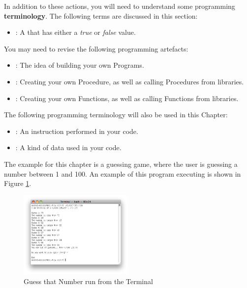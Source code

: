 In addition to these actions, you will need to understand some programming \textbf{terminology}. The following terms are discussed in this section:
\begin{itemize}
  \item {}: A  that has either a \emph{true} or \emph{false} value.
\end{itemize}

\bigskip

You may need to revise the following programming artefacts:
\begin{itemize}
  \item {}: The idea of building your own Programs.
  \item {}: Creating your own Procedure, as well as calling Procedures from libraries.
  \item {}: Creating your own Functions, as well as calling Functions from libraries.
\end{itemize}

The following programming terminology will also be used in this Chapter:
\begin{itemize}
  \item {}: An instruction performed in your code.
  \item {}: A kind of data used in your code.
\end{itemize}

The example for this chapter is a guessing game, where the user is guessing a number between 1 and 100. An example of this program executing is shown in Figure \ref{fig:control-flow-guess-num}.

\begin{figure}[h]
   \centering
   \includegraphics[width=0.5\textwidth]{./topics/control-flow/images/GuessThatNumber} 
   \caption[Guess That Number Terminal]{Guess that Number run from the Terminal}
   \label{fig:control-flow-guess-num}
\end{figure}

